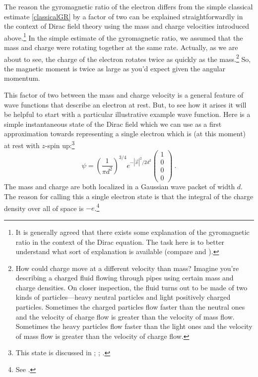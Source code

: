 \documentclass[12pt,secnumarabic,amsmath,amssymb,balancelastpage,nofootinbib]{article}
\begin{document}
The reason the gyromagnetic ratio of the electron differs from the simple classical estimate \eqref{classicalGR} by a factor of two can be explained straightforwardly in the context of Dirac field theory using the mass and charge velocities introduced above.\footnote{It is generally agreed that there exists some explanation of the gyromagnetic ratio in the context of the Dirac equation.  The task here is to better understand what sort of explanation is available (compare \citealp[pg.\ 504]{ohanian} and \citealp[section 1.4]{bjorkendrell}).}  In the simple estimate of the gyromagnetic ratio, we assumed that the mass and charge were rotating together at the same rate.  Actually, as we are about to see, the charge of the electron rotates twice as quickly as the mass.\footnote{How could charge move at a different velocity than mass?  Imagine you're describing a charged fluid flowing through pipes using certain mass and charge densities.  On closer inspection, the fluid turns out to be made of two kinds of particles---heavy neutral particles and light positively charged particles.  Sometimes the charged particles flow faster than the neutral ones and the velocity of charge flow is greater than the velocity of mass flow.  Sometimes the heavy particles flow faster than the light ones and the velocity of mass flow is greater than the velocity of charge flow.}  So, the magnetic moment is twice as large as you'd expect given the angular momentum.

This factor of two between the mass and charge velocity is a general feature of wave functions that describe an electron at rest.  But, to see how it arises it will be helpful to start with a particular illustrative example wave function.  Here is a simple instantaneous state of the Dirac field which we can use as a first approximation towards representing a single electron which is (at this moment) at rest with $z$-spin up:\footnote{This state is discussed in \citet[equation 12]{huang1952}; \citet[equation 3.32]{bjorkendrell}; \citet[equation 14]{ohanian}.}
\begin{equation}
\psi=\left(\frac{1}{\pi d^2}\right)^{3/4}e^{-|\vec{x}|^2/2d^2}\left(\begin{matrix} 1\\0\\0\\0 \end{matrix}\right)\ .
\label{ohanianstate}
\end{equation}
The mass and charge are both localized in a Gaussian wave packet of width $d$.  The reason for calling this a single electron state is that the integral of the charge density over all of space is $-e$.\footnote{See \citet[pg.\ 10]{takabayasi1957}.}
\end{document}
